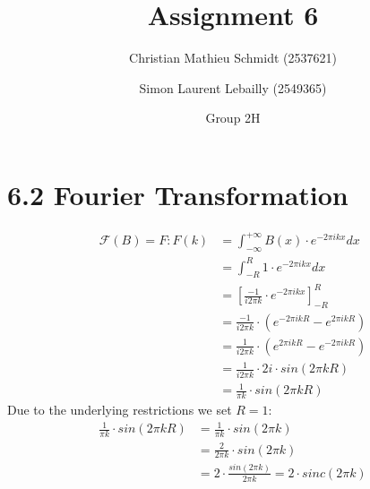 \documentclass{article}
\title{Assignment 6}
\author{Christian Mathieu Schmidt (2537621)
\and Simon Laurent Lebailly (2549365)\\
\and Group 2H}
\begin{document}
\maketitle


\section*{6.2 Fourier Transformation} \label{ex2}
    \begin{align}
        \mathcal{F}(B) = F : F(k) &= \int_{-\infty}^{+\infty} B(x) \cdot e^{-2\pi ikx}dx\\
        &= \int_{-R}^{R} 1 \cdot e^{-2\pi ikx}dx\\
        &= \left[ \frac{-1}{i2\pi k} \cdot e^{-2\pi ikx} \right]_{-R}^R\\
        &= \frac{-1}{i2\pi k} \cdot \left( e^{-2\pi ikR} - e^{2\pi ikR} \right)\\
        &= \frac{1}{i2\pi k} \cdot \left( e^{2\pi ikR} - e^{-2\pi ikR} \right)\\
        &= \frac{1}{i2\pi k} \cdot 2i \cdot sin(2\pi kR)\\
        &= \frac{1}{\pi k} \cdot sin(2\pi kR)
    \end{align}
    Due to the underlying restrictions we set $R=1$:
    \begin{align}
        \frac{1}{\pi k} \cdot sin(2\pi kR) &= \frac{1}{\pi k} \cdot sin(2\pi k)\\
        &= \frac{2}{2 \pi k} \cdot sin(2\pi k)\\
        &= 2 \cdot \frac{sin(2\pi k)}{2 \pi k} = 2 \cdot sinc(2 \pi k) 
    \end{align}
    
    
    
    
\end{document}
